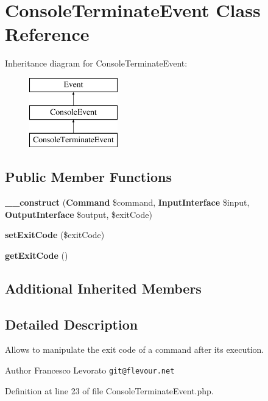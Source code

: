 \section{Console\+Terminate\+Event Class Reference}
\label{class_symfony_1_1_component_1_1_console_1_1_event_1_1_console_terminate_event}
Inheritance diagram for Console\+Terminate\+Event\+:\begin{figure}[H]
\begin{center}
\leavevmode
\includegraphics[height=3.000000cm]{class_symfony_1_1_component_1_1_console_1_1_event_1_1_console_terminate_event}
\end{center}
\end{figure}
\subsection*{Public Member Functions}
\begin{DoxyCompactItemize}
\item 
{\bf \+\_\+\+\_\+construct} ({\bf Command} \$command, {\bf Input\+Interface} \$input, {\bf Output\+Interface} \$output, \$exit\+Code)
\item 
{\bf set\+Exit\+Code} (\$exit\+Code)
\item 
{\bf get\+Exit\+Code} ()
\end{DoxyCompactItemize}
\subsection*{Additional Inherited Members}


\subsection{Detailed Description}
Allows to manipulate the exit code of a command after its execution.

\begin{DoxyAuthor}{Author}
Francesco Levorato {\tt git@flevour.\+net} 
\end{DoxyAuthor}


Definition at line 23 of file Console\+Terminate\+Event.\+php.



